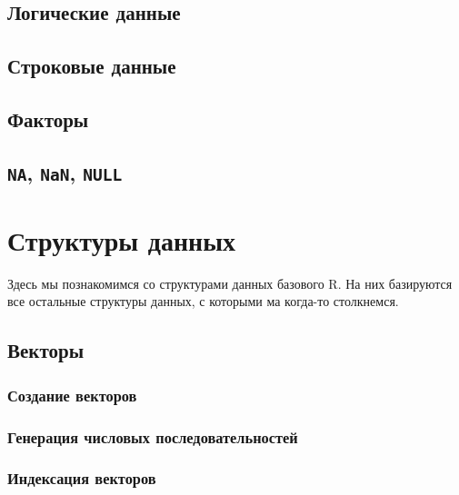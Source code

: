 \documentclass[
  letterpaper,
]{scrbook}
\theoremstyle{definition}
\theoremstyle{remark}
\begin{document}
\section{Логические данные}\label{rdtypes-logic}

\section{Строковые данные}\label{rdtypes-strings}

\section{Факторы}\label{rdtypes-factors}

\section{\texorpdfstring{\texttt{NA}, \texttt{NaN},
\texttt{NULL}}{NA, NaN, NULL}}\label{rdtypes-na}


\chapter{Структуры данных}\label{rdstructs}

Здесь мы познакомимся со структурами данных базового R. На них
базируются все остальные структуры данных, с которыми ма когда-то
столкнемся.

\section{Векторы}\label{rdstructs-vectors}

\subsection{Создание векторов}\label{rdstructs-vectors-creation}

\subsection{Генерация числовых
последовательностей}\label{rdstructs-vectors-sequences}

\subsection{Индексация векторов}\label{rdstructs-vectors-indexing}
\end{document}
